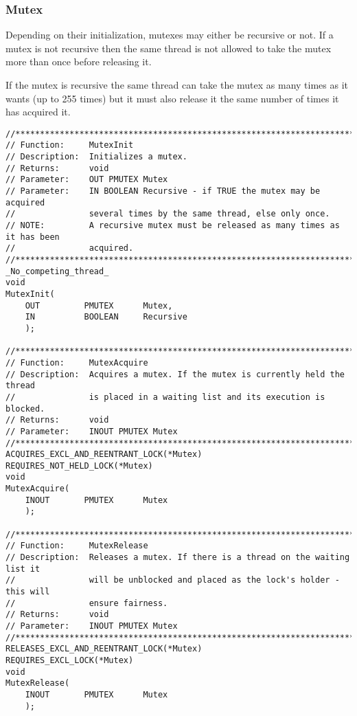 \begin{appendices}
\subsubsection{Mutex}
\label{sect:Mutex}

Depending on their initialization, mutexes may either be recursive or not. If a mutex is not
recursive then the same thread is not allowed to take the mutex more than once before releasing it.

If the mutex is recursive the same thread can take the mutex as many times as it wants (up to 255
times) but it must also release it the same number of times it has acquired it.

\begin{lstlisting}[caption={Mutex Functions},label={lst:MutexFunc}]
//******************************************************************************
// Function:     MutexInit
// Description:  Initializes a mutex.
// Returns:      void
// Parameter:    OUT PMUTEX Mutex
// Parameter:    IN BOOLEAN Recursive - if TRUE the mutex may be acquired
//               several times by the same thread, else only once.
// NOTE:         A recursive mutex must be released as many times as it has been
//               acquired.
//******************************************************************************
_No_competing_thread_
void
MutexInit(
    OUT         PMUTEX      Mutex,
    IN          BOOLEAN     Recursive
    );

//******************************************************************************
// Function:     MutexAcquire
// Description:  Acquires a mutex. If the mutex is currently held the thread
//               is placed in a waiting list and its execution is blocked.
// Returns:      void
// Parameter:    INOUT PMUTEX Mutex
//******************************************************************************
ACQUIRES_EXCL_AND_REENTRANT_LOCK(*Mutex)
REQUIRES_NOT_HELD_LOCK(*Mutex)
void
MutexAcquire(
    INOUT       PMUTEX      Mutex
    );

//******************************************************************************
// Function:     MutexRelease
// Description:  Releases a mutex. If there is a thread on the waiting list it
//               will be unblocked and placed as the lock's holder - this will
//               ensure fairness.
// Returns:      void
// Parameter:    INOUT PMUTEX Mutex
//******************************************************************************
RELEASES_EXCL_AND_REENTRANT_LOCK(*Mutex)
REQUIRES_EXCL_LOCK(*Mutex)
void
MutexRelease(
    INOUT       PMUTEX      Mutex
    );
\end{lstlisting}


\end{appendices}
